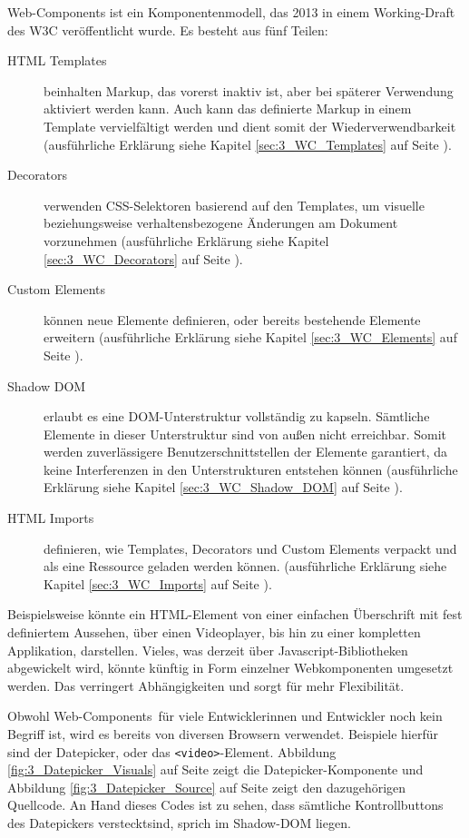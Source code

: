 Web-Components ist ein Komponentenmodell, das 2013 in einem Working-Draft des W3C veröffentlicht wurde. Es besteht aus fünf Teilen:
\begin{description}
\item[HTML Templates] beinhalten Markup, das vorerst inaktiv ist, aber bei späterer Verwendung aktiviert werden kann. Auch kann das definierte Markup in einem Template vervielfältigt werden und dient somit der Wiederverwendbarkeit (ausführliche Erklärung siehe Kapitel \ref{sec:3_WC_Templates} auf Seite \pageref{sec:3_WC_Templates}).
\item[Decorators] verwenden CSS-Selektoren basierend auf den Templates, um visuelle beziehungsweise verhaltensbezogene Änderungen am Dokument vorzunehmen (ausführliche Erklärung siehe Kapitel \ref{sec:3_WC_Decorators} auf Seite \pageref{sec:3_WC_Decorators}).
\item[Custom Elements] können neue Elemente definieren, oder bereits bestehende Elemente erweitern (ausführliche Erklärung siehe Kapitel \ref{sec:3_WC_Elements} auf Seite \pageref{sec:3_WC_Elements}).
\item[Shadow DOM] erlaubt es eine DOM-Unterstruktur vollständig zu kapseln. Sämtliche Elemente in dieser Unterstruktur sind von außen nicht erreichbar. Somit werden zuverlässigere Benutzerschnittstellen der Elemente garantiert, da keine Interferenzen in den Unterstrukturen entstehen können (ausführliche Erklärung siehe Kapitel \ref{sec:3_WC_Shadow_DOM} auf Seite \pageref{sec:3_WC_Shadow_DOM}).
\item[HTML Imports] definieren, wie Templates, Decorators und Custom Elements verpackt und als eine Ressource geladen werden können. (ausführliche Erklärung siehe Kapitel \ref{sec:3_WC_Imports} auf Seite \pageref{sec:3_WC_Imports}).
\end{description}

Beispielsweise könnte ein HTML-Element von einer einfachen Überschrift mit fest definiertem Aussehen, über einen Videoplayer, bis hin zu einer kompletten Applikation, darstellen. Vieles, was derzeit über Javascript-Bibliotheken abgewickelt wird, könnte künftig in Form einzelner Webkomponenten umgesetzt werden. Das verringert Abhängigkeiten und sorgt für mehr Flexibilität.

Obwohl \glqq Web-Components\grqq\ für viele Entwicklerinnen und Entwickler noch kein Begriff ist, wird es bereits von diversen Browsern verwendet. Beispiele hierfür sind der \glqq Datepicker\grqq , oder das \lstinline|<video>|-Element. Abbildung \ref{fig:3_Datepicker_Visuals} auf Seite \pageref{fig:3_Datepicker_Visuals} zeigt die Datepicker-Komponente und Abbildung \ref{fig:3_Datepicker_Source} auf Seite \pageref{fig:3_Datepicker_Source} zeigt den dazugehörigen Quellcode. An Hand dieses Codes ist zu sehen, dass sämtliche Kontrollbuttons des Datepickers \glqq versteckt\grqq sind, sprich im Shadow-DOM liegen.


